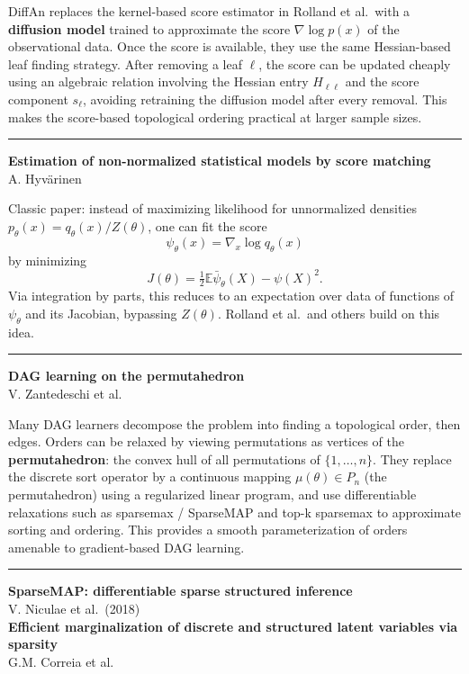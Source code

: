 \documentclass[a5paper]{article}
\begin{document}
DiffAn replaces the kernel-based score estimator in Rolland et al.~with
a \textbf{diffusion model} trained to approximate the score $\nabla \log p(x)$
of the observational data. Once the score is available, they use the
same Hessian-based leaf finding strategy. After removing a leaf $\ell$, the
score can be updated cheaply using an algebraic relation involving the
Hessian entry $H_{\ell\ell}$ and the score component $s_\ell$, avoiding
retraining the diffusion model after every removal. This makes the
score-based topological ordering practical at larger sample sizes.

\begin{center}\rule{0.5\linewidth}{0.5pt}\end{center}

\textbf{Estimation of non-normalized statistical models by score
matching}\\
A. Hyvärinen

Classic paper: instead of maximizing likelihood for unnormalized
densities $p_\theta(x)=q_\theta(x)/Z(\theta)$, one can fit the score
\[ \psi_\theta(x) = \nabla_x \log q_\theta(x) \]
by minimizing
\[ J(\theta)=\tfrac12
\mathbb{E}\bar\psi_\theta(X)-\psi(X)^2. \]
Via integration by parts, this reduces to an expectation over data of
functions of $\psi_\theta$ and its Jacobian, bypassing $Z(\theta)$. Rolland et al.~and
others build on this idea.

\begin{center}\rule{0.5\linewidth}{0.5pt}\end{center}

\textbf{DAG learning on the permutahedron}\\
V. Zantedeschi et al.

Many DAG learners decompose the problem into finding a topological
order, then edges. Orders can be relaxed by viewing permutations as
vertices of the \textbf{permutahedron}: the convex hull of all
permutations of $\{1,\ldots,n\}$. They replace the discrete sort
operator by a continuous mapping $\mu(\theta) \in P_n$ (the permutahedron) using a
regularized linear program, and use differentiable relaxations such as
sparsemax / SparseMAP and top-k sparsemax to approximate sorting and
ordering. This provides a smooth parameterization of orders amenable to
gradient-based DAG learning.

\begin{center}\rule{0.5\linewidth}{0.5pt}\end{center}

\textbf{SparseMAP: differentiable sparse structured inference}\\
V. Niculae et al.~(2018)\\
\textbf{Efficient marginalization of discrete and structured latent
variables via sparsity}\\
G.M. Correia et al.
\end{document}
